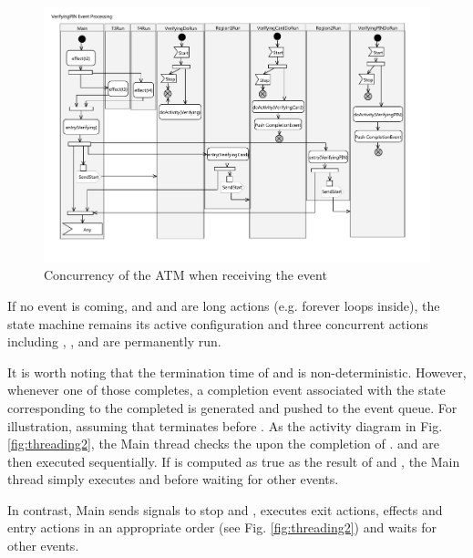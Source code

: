 \begin{figure}
	\centering
	\includegraphics[clip, trim=1.0cm 1.6cm 1.6cm 1cm, width=1.03\columnwidth]{figures/ThreadingExample.pdf}
	\caption{Concurrency of the ATM when receiving the  event} 
	\label{fig:threading1}
\end{figure}

If no event is coming, and  and  are long actions (e.g. forever loops inside), the state machine remains its active configuration and three concurrent actions including , , and  are permanently run.

It is worth noting that the termination time of  and  is non-deterministic. 
However, whenever one of those completes, a completion event associated with the state corresponding to the completed  is generated and pushed to the event queue. 
For illustration, assuming that  terminates before . 
As the activity diagram in Fig. \ref{fig:threading2}, the Main thread checks the  upon the completion of .  and  are then executed sequentially. If  is computed as true as the result of  and , the Main thread simply executes  and  before waiting for other events.

In contrast, Main sends  signals to stop  and , executes exit actions, effects and entry actions in an appropriate order (see Fig. \ref{fig:threading2}) and waits for other events.

